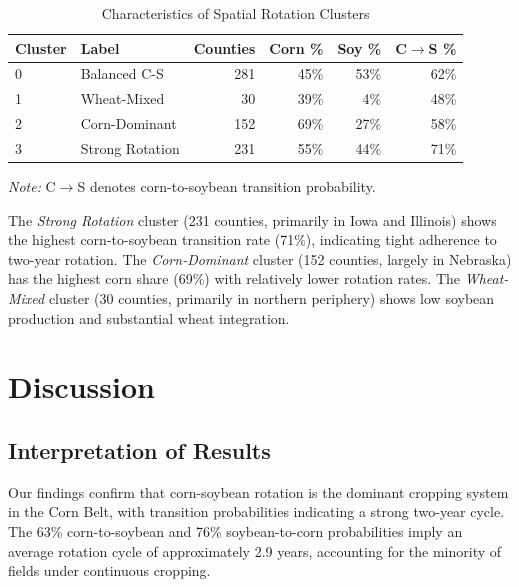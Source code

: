 \documentclass[12pt, a4paper]{article}
\begin{document}
\begin{table}[H]
\centering
\caption{Characteristics of Spatial Rotation Clusters}
\label{tab:clusters}
\begin{tabular}{llrrrr}
\toprule
\textbf{Cluster} & \textbf{Label} & \textbf{Counties} & \textbf{Corn \%} & \textbf{Soy \%} & \textbf{C$\rightarrow$S \%} \\
\midrule
0 & Balanced C-S & 281 & 45\% & 53\% & 62\% \\
1 & Wheat-Mixed & 30 & 39\% & 4\% & 48\% \\
2 & Corn-Dominant & 152 & 69\% & 27\% & 58\% \\
3 & Strong Rotation & 231 & 55\% & 44\% & 71\% \\
\bottomrule
\end{tabular}
\vspace{0.2cm}
\small
\textit{Note:} C$\rightarrow$S denotes corn-to-soybean transition probability.
\end{table}

The \textit{Strong Rotation} cluster (231 counties, primarily in Iowa and Illinois) shows the highest corn-to-soybean transition rate (71\%), indicating tight adherence to two-year rotation. The \textit{Corn-Dominant} cluster (152 counties, largely in Nebraska) has the highest corn share (69\%) with relatively lower rotation rates. The \textit{Wheat-Mixed} cluster (30 counties, primarily in northern periphery) shows low soybean production and substantial wheat integration.


\section{Discussion}
\label{sec:discussion}

\subsection{Interpretation of Results}

Our findings confirm that corn-soybean rotation is the dominant cropping system in the Corn Belt, with transition probabilities indicating a strong two-year cycle. The 63\% corn-to-soybean and 76\% soybean-to-corn probabilities imply an average rotation cycle of approximately 2.9 years, accounting for the minority of fields under continuous cropping.
\end{document}
